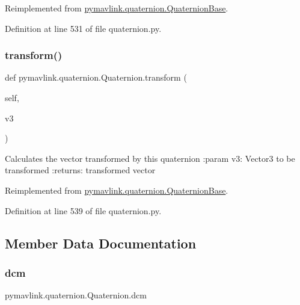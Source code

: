 Reimplemented from \mbox{\hyperlink{classpymavlink_1_1quaternion_1_1QuaternionBase_a6d4db8c4ecf5f04d0ebaf798d17605cf}{pymavlink.\+quaternion.\+Quaternion\+Base}}.



Definition at line 531 of file quaternion.\+py.

\mbox{\label{classpymavlink_1_1quaternion_1_1Quaternion_a79b86f00f3500a6c34fa3a099f3714f7}} 
\subsubsection{\texorpdfstring{transform()}{transform()}}
{\footnotesize\ttfamily def pymavlink.\+quaternion.\+Quaternion.\+transform (\begin{DoxyParamCaption}\item[{}]{self,  }\item[{}]{v3 }\end{DoxyParamCaption})}

\begin{DoxyVerb}Calculates the vector transformed by this quaternion
:param v3: Vector3 to be transformed
:returns: transformed vector
\end{DoxyVerb}
 

Reimplemented from \mbox{\hyperlink{classpymavlink_1_1quaternion_1_1QuaternionBase_a747068d71180696e5131e2ca31c2a13c}{pymavlink.\+quaternion.\+Quaternion\+Base}}.



Definition at line 539 of file quaternion.\+py.



\subsection{Member Data Documentation}
\mbox{\label{classpymavlink_1_1quaternion_1_1Quaternion_ad761e43a004cb119c4434cb6779b8206}} 
\subsubsection{\texorpdfstring{dcm}{dcm}}
{\footnotesize\ttfamily pymavlink.\+quaternion.\+Quaternion.\+dcm}



